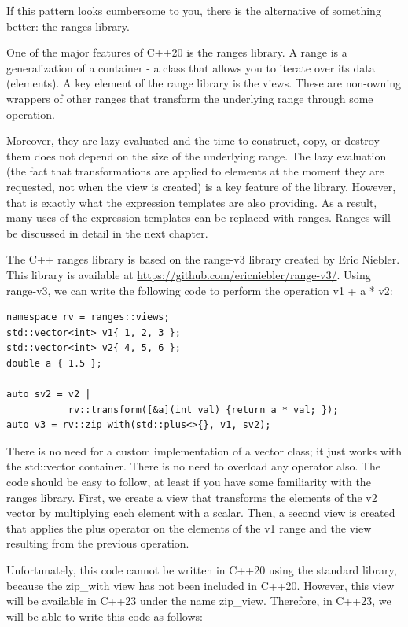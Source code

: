 If this pattern looks cumbersome to you, there is the alternative of something better: the ranges library.


One of the major features of C++20 is the ranges library. A range is a generalization of a container - a class that allows you to iterate over its data (elements). A key element of the range library is the views. These are non-owning wrappers of other ranges that transform the underlying range through some operation.

Moreover, they are lazy-evaluated and the time to construct, copy, or destroy them does not depend on the size of the underlying range. The lazy evaluation (the fact that transformations are applied to elements at the moment they are requested, not when the view is created) is a key feature of the library. However, that is exactly what the expression templates are also providing. As a result, many uses of the expression templates can be replaced with ranges. Ranges will be discussed in detail in the next chapter.

The C++ ranges library is based on the range-v3 library created by Eric Niebler. This library is available at \url{https://github.com/ericniebler/range-v3/}. Using range-v3, we can write the following code to perform the operation v1 + a * v2:

\begin{lstlisting}[style=styleCXX]
namespace rv = ranges::views;
std::vector<int> v1{ 1, 2, 3 };
std::vector<int> v2{ 4, 5, 6 };
double a { 1.5 };

auto sv2 = v2 |
		   rv::transform([&a](int val) {return a * val; });
auto v3 = rv::zip_with(std::plus<>{}, v1, sv2);
\end{lstlisting}

There is no need for a custom implementation of a vector class; it just works with the std::vector container. There is no need to overload any operator also. The code should be easy to follow, at least if you have some familiarity with the ranges library. First, we create a view that transforms the elements of the v2 vector by multiplying each element with a scalar. Then, a second view is created that applies the plus operator on the elements of the v1 range and the view resulting from the previous operation.

Unfortunately, this code cannot be written in C++20 using the standard library, because the zip\_with view has not been included in C++20. However, this view will be available in C++23 under the name zip\_view. Therefore, in C++23, we will be able to write this code as follows:

